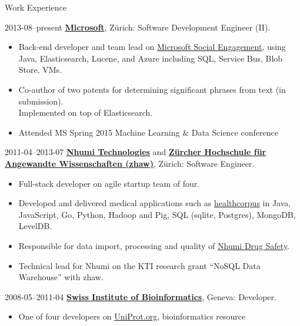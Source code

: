 \begin{cv}{}
  \begin{cvlist}{Work Experience}
  \item[2013-08--present]
    \textbf{\href{http://www.microsoft.com/}{Microsoft}}, Zürich:
    Software Development Engineer (II).
    \begin{itemize}
    \item Back-end developer and team lead on
      \href{http://www.microsoft.com/en-us/dynamics/crm-social.aspx}{Microsoft
        Social Engagement}, using Java, Elasticsearch, Lucene, and
      Azure including SQL, Service Bus, Blob Store, VMs.
    \item Co-author of two patents for determining significant phrases
      from text (in submission).\\Implemented on top of Elasticsearch.
    \item Attended MS Spring 2015 Machine Learning \& Data Science conference
    \end{itemize}
  \item[2011-04--2013-07] \textbf{\href{http://nhumi.com/}{Nhumi
        Technologies}} and
    \textbf{\href{http://www.zhaw.ch/en/zurich-university-of-applied-sciences.html}{Zürcher
        Hochschule für Angewandte Wis\-sen\-schaf\-ten (zhaw)}},
    Zürich: Software Engineer.
    \begin{itemize}
    \item Full-stack developer on agile startup team of four.
    \item Developed and delivered medical applications such as
      \href{http://healthcorpus.com}{healthcorpus} in Java,
      JavaScript, Go, Python, Hadoop and Pig, SQL (sqlite, Postgres),
      MongoDB, LevelDB.
    \item Responsible for data import, processing and quality of
      \href{http://drugsafety.nhumi.com/drugsafety/}{Nhumi Drug
        Safety}.
    \item Technical lead for Nhumi on the KTI research grant ``NoSQL
      Data Warehouse'' with zhaw.
    \end{itemize}
  \item[2008-05--2011-04] \textbf{\href{http://www.isb-sib.ch/}{Swiss
        Institute of Bioinformatics}}, Geneva: Developer.
    \begin{itemize}
    \item One of four developers on
      \href{http://www.uniprot.org/}{UniProt.org}, bioinformatics resource

\end{itemize}
\end{cvlist}
\end{cv}
